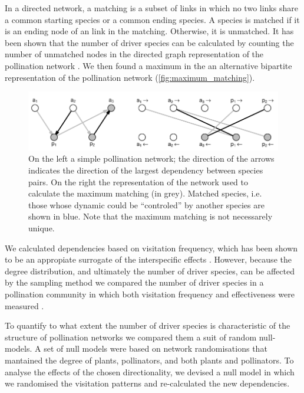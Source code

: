 \documentclass[a4paper]{article}
\begin{document}
In a directed network, a matching is a subset of links in which no two links share a common starting species or a common ending species. A species is matched if it is an ending node of an link in the matching. Otherwise, it is unmatched. It has been shown that the number of driver species can be calculated by counting the number of unmatched nodes in the directed graph representation of the pollination network \autocite{Liu2011}. We then found a maximum in the an alternative bipartite representation of the pollination network \autocite{Csardi2006} (\autoref{fig:maximum_matching}). 

\begin{figure}
    \centering
    \includegraphics[width=\textwidth]{control_net}
    \caption{
    On the left a simple pollination network; the direction of the arrows indicates the direction of the largest dependency between species pairs. On the right the representation of the network used to calculate the maximum matching (in grey). Matched species, i.e. those whose dynamic could be ``controled'' by another species are shown in blue. Note that the maximum matching is not necessarely unique.
    }
    \label{fig:maximum_matching}
\end{figure} 

We calculated dependencies based on visitation frequency, which has been shown to be an appropiate surrogate of the interspecific effects \autocite{Bascompte2006, Vazquez2005}. However, because the degree distribution, and ultimately the number of driver species, can be affected by the sampling method \autocite{Bluthgen2010} we compared the number of driver species in a pollination community in which both visitation frequency and effectiveness were measured \autocite{Ballantyne2015}.

To quantify to what extent the number of driver species is characteristic of the structure of pollination networks we compared them a suit of random null-models. A set of null models were based on network randomisations that mantained the degree of plants, pollinators, and both plants and pollinators. To analyse the effects of the chosen directionality, we devised a null model in which we randomised the visitation patterns and re-calculated the new dependencies. 
\end{document}
